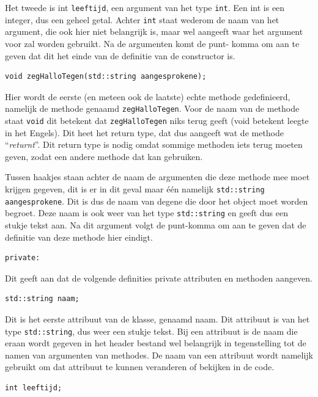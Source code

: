 \documentclass{article}
\begin{document}
Het tweede is int \texttt{leeftijd}, een argument van het type \texttt{int}. Een int is een integer, dus een geheel getal. Achter \texttt{int} staat wederom de naam van het argument, die ook hier niet belangrijk is, maar wel aangeeft waar het argument voor zal worden gebruikt. Na de argumenten komt de punt- komma om aan te geven dat dit het einde van de definitie van de constructor is.

\begin{lstlisting}[frame=none]
void zegHalloTegen(std::string aangesprokene);
\end{lstlisting}

Hier wordt de eerste (en meteen ook de laatste) echte methode gedefinieerd, namelijk de methode genaamd \texttt{zegHalloTegen}. Voor de naam van de methode staat \texttt{void} dit betekent dat \texttt{zegHalloTegen} niks terug geeft (void betekent leegte in het Engels). Dit heet het return type, dat dus aangeeft wat de methode “\emph{returnt}”. Dit return type is nodig omdat sommige methoden iets terug moeten geven, zodat een andere methode dat kan gebruiken.

Tussen haakjes staan achter de naam de argumenten die deze methode mee moet krijgen gegeven, dit is er in dit geval maar één namelijk \texttt{std::string aangesprokene}. Dit is dus de naam van degene die door het object moet worden begroet. Deze naam is ook weer van het type \texttt{std::string} en geeft dus een stukje tekst aan. Na dit argument volgt de punt-komma om aan te geven dat de definitie van deze methode hier eindigt.

\begin{lstlisting}[frame=none]
private:
\end{lstlisting}

Dit geeft aan dat de volgende definities private attributen en methoden aangeven.

\begin{lstlisting}[frame=none]
std::string naam; 
\end{lstlisting}

Dit is het eerste attribuut van de klasse, genaamd naam. Dit attribuut is van het type \texttt{std::string}, dus weer een stukje tekst. Bij een attribuut is de naam die eraan wordt gegeven in het header bestand wel belangrijk in tegenstelling tot de namen van argumenten van methodes. De naam van een attribuut wordt namelijk gebruikt om dat attribuut te kunnen veranderen of bekijken in de code.

\begin{lstlisting}[frame=none]
int leeftijd;
\end{lstlisting}
\end{document}
